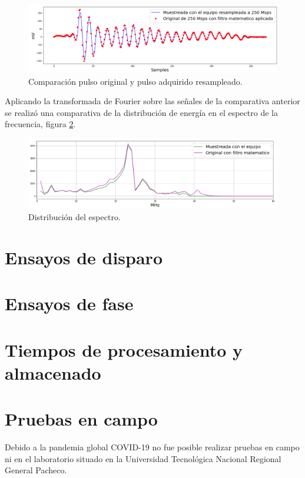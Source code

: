 \begin{figure}[ht]
	\centering
	\includegraphics[width=140mm]{./Figures/compPulsos.png}
	\caption{Comparación pulso original y pulso adquirido resampleado.}
	\label{fig:compPulsos}
\end{figure}

\vspace{20mm}

Aplicando la transformada de Fourier sobre las señales de la comparativa anterior se realizó una comparativa de la distribución de energía en el espectro de la frecuencia, figura \ref{fig:compEspectro}.

\begin{figure}[ht]
	\centering
	\includegraphics[width=140mm]{./Figures/compEspectro.png}
	\caption{Distribución del espectro.}
	\label{fig:compEspectro}
\end{figure}

\section{Ensayos de disparo}

\section{Ensayos de fase}

\section{Tiempos de procesamiento y almacenado}

\section{Pruebas en campo}
Debido a la pandemia global COVID-19 no fue posible realizar pruebas en campo ni en el laboratorio situado en la Universidad Tecnológica Nacional Regional General Pacheco.